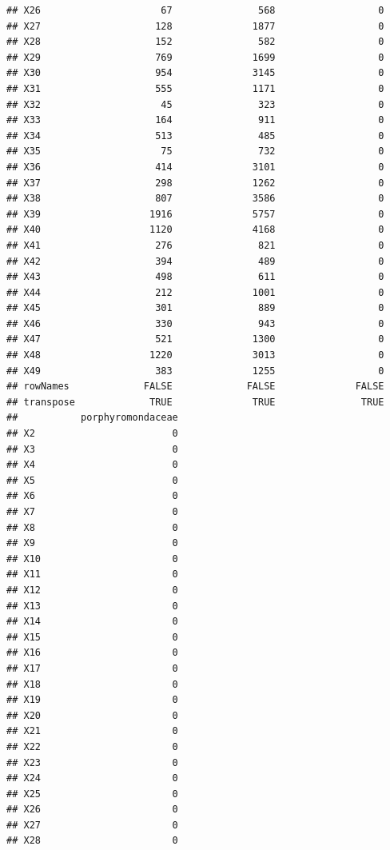 \documentclass[10pt,handout,english]{beamer}\usepackage[]{graphicx}\usepackage[]{color}
\makeatletter
\newenvironment{kframe}{%
 \def\at@end@of@kframe{}%
 \ifinner\ifhmode%
  \def\at@end@of@kframe{\end{minipage}}%
  \begin{minipage}{\columnwidth}%
 \fi\fi%
 \def\FrameCommand##1{\hskip\@totalleftmargin \hskip-\fboxsep
 \colorbox{shadecolor}{##1}\hskip-\fboxsep
     \hskip-\linewidth \hskip-\@totalleftmargin \hskip\columnwidth}%
 \MakeFramed {\advance\hsize-\width
   \@totalleftmargin\z@ \linewidth\hsize
   \@setminipage}}%
 {\par\unskip\endMakeFramed%
 \at@end@of@kframe}
\newenvironment{knitrout}{}{} %
\makeatother
\begin{document}
\begin{frame}[fragile]
\begin{knitrout}
\begin{kframe}
\begin{verbatim}
## X26                     67               568                  0
## X27                    128              1877                  0
## X28                    152               582                  0
## X29                    769              1699                  0
## X30                    954              3145                  0
## X31                    555              1171                  0
## X32                     45               323                  0
## X33                    164               911                  0
## X34                    513               485                  0
## X35                     75               732                  0
## X36                    414              3101                  0
## X37                    298              1262                  0
## X38                    807              3586                  0
## X39                   1916              5757                  0
## X40                   1120              4168                  0
## X41                    276               821                  0
## X42                    394               489                  0
## X43                    498               611                  0
## X44                    212              1001                  0
## X45                    301               889                  0
## X46                    330               943                  0
## X47                    521              1300                  0
## X48                   1220              3013                  0
## X49                    383              1255                  0
## rowNames             FALSE             FALSE              FALSE
## transpose             TRUE              TRUE               TRUE
##           porphyromondaceae
## X2                        0
## X3                        0
## X4                        0
## X5                        0
## X6                        0
## X7                        0
## X8                        0
## X9                        0
## X10                       0
## X11                       0
## X12                       0
## X13                       0
## X14                       0
## X15                       0
## X16                       0
## X17                       0
## X18                       0
## X19                       0
## X20                       0
## X21                       0
## X22                       0
## X23                       0
## X24                       0
## X25                       0
## X26                       0
## X27                       0
## X28                       0

\end{verbatim}
\end{kframe}
\end{knitrout}
\end{frame}
\end{document}
